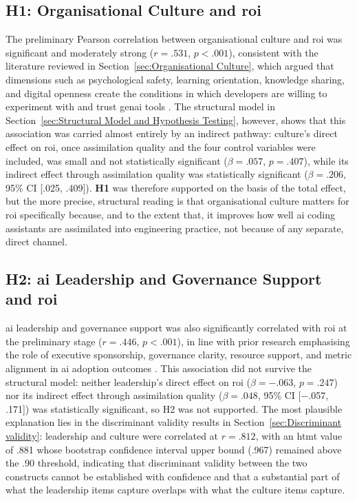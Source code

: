 \subsection{H1: Organisational Culture and \gls{roi}}
\label{sec:Discussion H1}
The preliminary Pearson correlation between organisational culture and \gls{roi} was significant and moderately strong ($r = .531$, $p < .001$), consistent with the literature reviewed in Section~\ref{sec:Organisational Culture}, which argued that dimensions such as psychological safety, learning orientation, knowledge sharing, and digital openness create the conditions in which developers are willing to experiment with and trust \gls{genai} tools \autocite{Noy2023}. The structural model in Section~\ref{sec:Structural Model and Hypothesis Testing}, however, shows that this association was carried almost entirely by an indirect pathway: culture's direct effect on \gls{roi}, once assimilation quality and the four control variables were included, was small and not statistically significant ($\beta = .057$, $p = .407$), while its indirect effect through assimilation quality was statistically significant ($\beta = .206$, 95\% CI [.025, .409]). \textbf{H1} was therefore supported on the basis of the total effect, but the more precise, structural reading is that organisational culture matters for \gls{roi} specifically because, and to the extent that, it improves how well \gls{ai} coding assistants are assimilated into engineering practice, not because of any separate, direct channel.

\subsection{H2: \gls{ai} Leadership and Governance Support and \gls{roi}}
\label{sec:Discussion H2}
\gls{ai} leadership and governance support was also significantly correlated with \gls{roi} at the preliminary stage ($r = .446$, $p < .001$), in line with prior research emphasising the role of executive sponsorship, governance clarity, resource support, and metric alignment in \gls{ai} adoption outcomes \autocite{Brynjolfsson2025}. This association did not survive the structural model: neither leadership's direct effect on \gls{roi} ($\beta = -.063$, $p = .247$) nor its indirect effect through assimilation quality ($\beta = .048$, 95\% CI [$-$.057, .171]) was statistically significant, so H2 was not supported. The most plausible explanation lies in the discriminant validity results in Section~\ref{sec:Discriminant validity}: leadership and culture were correlated at $r = .812$, with an \gls{htmt} value of .881 whose bootstrap confidence interval upper bound (.967) remained above the .90 threshold, indicating that discriminant validity between the two constructs cannot be established with confidence and that a substantial part of what the leadership items capture overlaps with what the culture items capture. 

